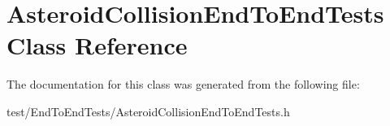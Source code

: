 \hypertarget{classAsteroidCollisionEndToEndTests}{}\section{Asteroid\+Collision\+End\+To\+End\+Tests Class Reference}
\label{classAsteroidCollisionEndToEndTests}


The documentation for this class was generated from the following file\+:\begin{DoxyCompactItemize}
\item 
test/\+End\+To\+End\+Tests/Asteroid\+Collision\+End\+To\+End\+Tests.\+h\end{DoxyCompactItemize}

